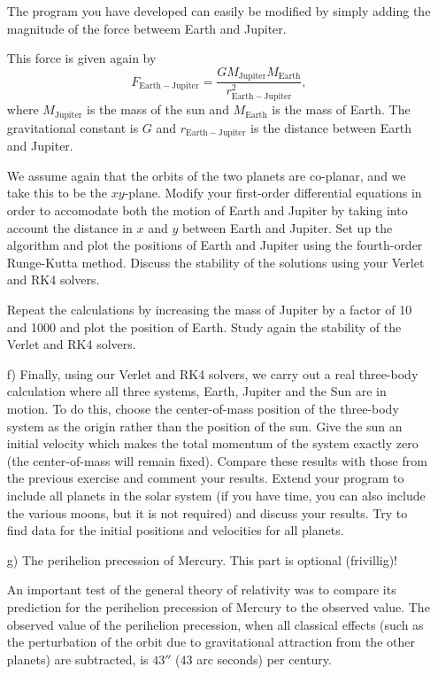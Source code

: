 \documentclass[a4wide,12pt]{article}
\begin{document}
\begin{enumerate}
The program you have developed can easily be modified by simply adding the magnitude of the force betweem Earth and Jupiter.

This force is given again by 
\[
F_{\mathrm{Earth-Jupiter}}=\frac{GM_{\mathrm{Jupiter}}M_{\mathrm{Earth}}}{r_{\mathrm{Earth-Jupiter}}^2},
\]
where $M_{\mathrm{Jupiter}}$ is the mass of the sun and $M_{\mathrm{Earth}}$ is the mass of Earth. 
The gravitational constant is $G$ and $r_{\mathrm{Earth-Jupiter}}$ is the distance between Earth and Jupiter.

We assume again that the orbits of the two planets are co-planar, and we take this to be the $xy$-plane. 
Modify your first-order differential equations in order to accomodate both the
motion of Earth and Jupiter by taking into account the distance in $x$ and
$y$ between Earth and Jupiter. Set up the algorithm and plot the positions of Earth and Jupiter using the fourth-order Runge-Kutta method.  
Discuss the stability of the solutions using your Verlet and RK4 solvers.

Repeat 
the calculations by increasing the mass of Jupiter by a factor of 10 and 1000
 and plot the position of Earth.  Study again the stability of the Verlet and RK4 solvers.

\item[f)] Finally, using our Verlet and RK4 solvers, we carry out a real three-body calculation where all three systems, 
Earth, Jupiter and the Sun are in motion. To do this, choose the center-of-mass position of the three-body system as 
the origin rather than the position of the sun. Give the sun an initial velocity which makes the total momentum of the system exactly zero (the center-of-mass will remain fixed). Compare these results with those from the previous exercise and comment your results. Extend your program to include all planets in the solar system (if you have time, you can also include the various moons, but it is not required) and discuss your results. Try to find data for the initial positions and velocities for all planets. 


\item[g)] The perihelion precession of Mercury. This part is optional (frivillig)!  

An important test of the general theory of relativity was to compare its prediction for the
perihelion precession of Mercury to the observed value. The observed value of the perihelion precession, when
all classical effects (such as the perturbation of the orbit due to gravitational attraction from the other planets) are
subtracted, is $43''$ ($43$ arc seconds) per century.


\end{enumerate}
\end{document}
